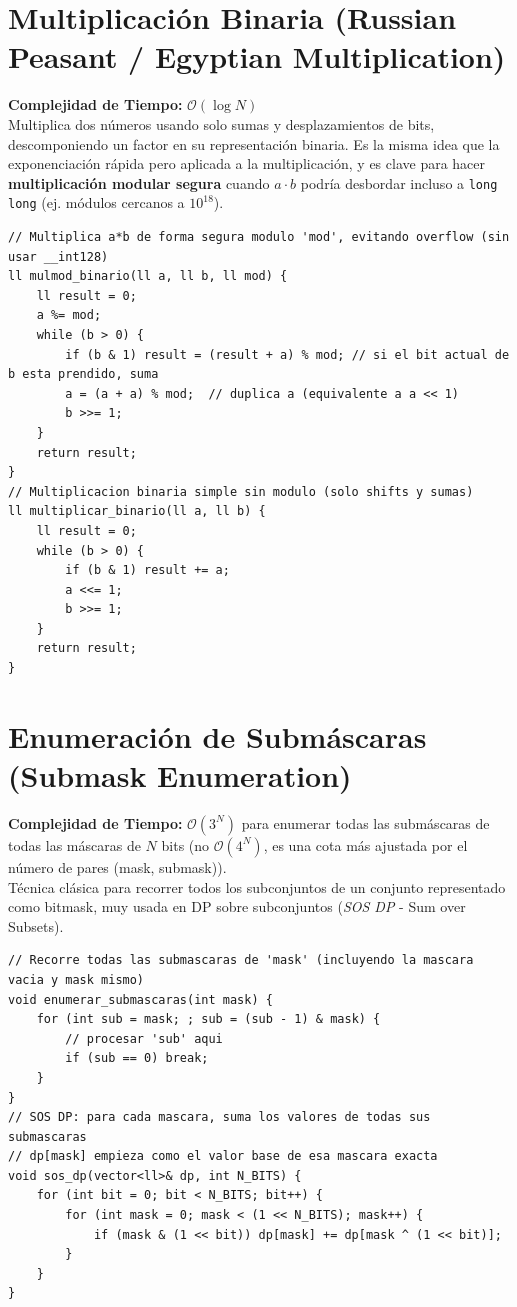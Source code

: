 \documentclass[10pt,twocolumn,letterpaper]{report}
\begin{document}
\section{Multiplicación Binaria (Russian Peasant / Egyptian Multiplication)}
\textbf{Complejidad de Tiempo:} $\mathcal{O}(\log N)$ \\
Multiplica dos números usando solo sumas y desplazamientos de bits, descomponiendo un factor en su representación binaria. Es la misma idea que la exponenciación rápida pero aplicada a la multiplicación, y es clave para hacer \textbf{multiplicación modular segura} cuando $a \cdot b$ podría desbordar incluso a \texttt{long long} (ej. módulos cercanos a $10^{18}$).
\begin{lstlisting}
// Multiplica a*b de forma segura modulo 'mod', evitando overflow (sin usar __int128)
ll mulmod_binario(ll a, ll b, ll mod) {
    ll result = 0;
    a %= mod;
    while (b > 0) {
        if (b & 1) result = (result + a) % mod; // si el bit actual de b esta prendido, suma
        a = (a + a) % mod;  // duplica a (equivalente a a << 1)
        b >>= 1;
    }
    return result;
}
// Multiplicacion binaria simple sin modulo (solo shifts y sumas)
ll multiplicar_binario(ll a, ll b) {
    ll result = 0;
    while (b > 0) {
        if (b & 1) result += a;
        a <<= 1;
        b >>= 1;
    }
    return result;
}
\end{lstlisting}
\section{Enumeración de Submáscaras (Submask Enumeration)}
\textbf{Complejidad de Tiempo:} $\mathcal{O}(3^N)$ para enumerar todas las submáscaras de todas las máscaras de $N$ bits (no $\mathcal{O}(4^N)$, es una cota más ajustada por el número de pares (mask, submask)). \\
Técnica clásica para recorrer todos los subconjuntos de un conjunto representado como bitmask, muy usada en DP sobre subconjuntos (\textit{SOS DP} - Sum over Subsets).
\begin{lstlisting}
// Recorre todas las submascaras de 'mask' (incluyendo la mascara vacia y mask mismo)
void enumerar_submascaras(int mask) {
    for (int sub = mask; ; sub = (sub - 1) & mask) {
        // procesar 'sub' aqui
        if (sub == 0) break;
    }
}
// SOS DP: para cada mascara, suma los valores de todas sus submascaras
// dp[mask] empieza como el valor base de esa mascara exacta
void sos_dp(vector<ll>& dp, int N_BITS) {
    for (int bit = 0; bit < N_BITS; bit++) {
        for (int mask = 0; mask < (1 << N_BITS); mask++) {
            if (mask & (1 << bit)) dp[mask] += dp[mask ^ (1 << bit)];
        }
    }
}
\end{lstlisting}
\end{document}
